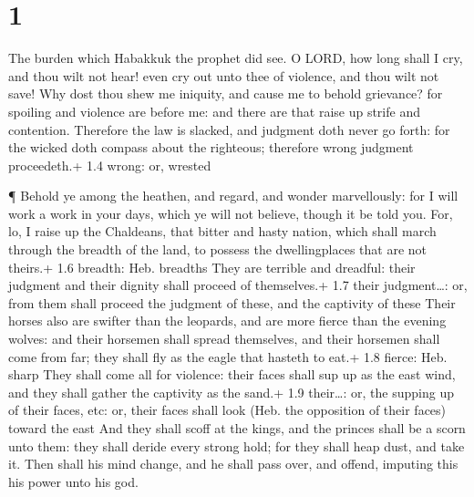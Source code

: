\hypertarget{section}{%
\section{1}\label{section}}

 The burden which Habakkuk the prophet did see. 
O LORD, how long shall I cry, and thou wilt not hear! even cry out unto
thee of violence, and thou wilt not save!  Why dost thou
shew me iniquity, and cause me to behold grievance? for spoiling and
violence are before me: and there are that raise up strife and
contention.  Therefore the law is slacked, and judgment doth
never go forth: for the wicked doth compass about the righteous;
therefore wrong judgment proceedeth.+ 1.4 wrong: or, wrested

 ¶ Behold ye among the heathen, and regard, and wonder
marvellously: for I will work a work in your days, which ye will not
believe, though it be told you.  For, lo, I raise up the
Chaldeans, that bitter and hasty nation, which shall march through the
breadth of the land, to possess the dwellingplaces that are not theirs.+
1.6 breadth: Heb. breadths  They are terrible and dreadful:
their judgment and their dignity shall proceed of themselves.+ 1.7 their
judgment\ldots: or, from them shall proceed the judgment of these, and
the captivity of these  Their horses also are swifter than
the leopards, and are more fierce than the evening wolves: and their
horsemen shall spread themselves, and their horsemen shall come from
far; they shall fly as the eagle that hasteth to eat.+ 1.8 fierce: Heb.
sharp  They shall come all for violence: their faces shall
sup up as the east wind, and they shall gather the captivity as the
sand.+ 1.9 their\ldots: or, the supping up of their faces, etc: or,
their faces shall look (Heb. the opposition of their faces) toward the
east  And they shall scoff at the kings, and the princes
shall be a scorn unto them: they shall deride every strong hold; for
they shall heap dust, and take it.  Then shall his mind
change, and he shall pass over, and offend, imputing this his power unto
his god.

